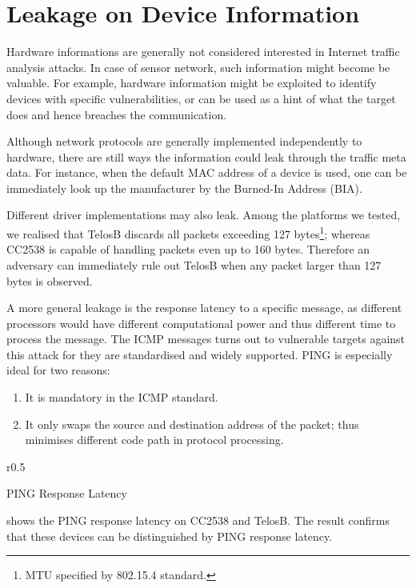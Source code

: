 \section{Leakage on Device Information}


Hardware informations are generally not considered interested in Internet traffic analysis attacks. In case of sensor network, such 
information might become be valuable. For example, hardware information might be exploited to identify devices with specific vulnerabilities, or can be used as a hint of what the target does and hence breaches the communication.

Although network protocols are generally implemented independently to hardware, there are still ways the information could leak through the traffic meta data. For instance, when the default MAC address of a device is used, one can be immediately look up the manufacturer by the Burned-In Address (BIA)\cite{BIA}.

Different driver implementations may also leak. Among the platforms we tested, we realised that TelosB\cite{TelosB} discards all packets exceeding 127 bytes\footnote{MTU specified by 802.15.4 standard.}; whereas CC2538 is capable of handling packets even up to 160 bytes. Therefore an adversary can immediately rule out TelosB when any packet larger than 127 bytes is observed.

A more general leakage is the response latency to a specific message, as different processors would have different computational power and thus different time to process the message. The ICMP messages turns out to vulnerable targets against this attack for they are standardised and widely supported. PING is especially ideal for two reasons: 
\begin{enumerate}
	\item It is mandatory in the ICMP standard.
	\item It only swaps the source and destination address of the packet; thus minimises different code path in protocol processing.
\end{enumerate}

\begin{table}{r}{0.5\textwidth}
	\center
	
	\caption{PING Response Latency\label{PingResponse}}
\end{table}

 shows the PING response latency on CC2538 and TelosB. The result confirms that these devices can be distinguished by PING response latency.


